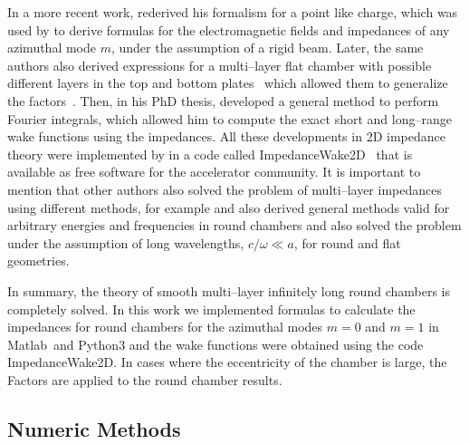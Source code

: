     In a more recent work,  rederived his formalism for a point like charge, which was used by  to derive formulas for the electromagnetic fields and impedances of any azimuthal mode $m$, under the assumption of a rigid beam. Later, the same authors also derived expressions for a multi--layer flat chamber with possible different layers in the top and bottom plates~\cite{Mounet2010a} which allowed them to generalize the  factors~\cite{Mounet2010}. Then, in his PhD thesis,  developed a general method to perform Fourier integrals, which allowed him to compute the exact short and long--range wake functions using the impedances. All these developments in 2D impedance theory were implemented by  in a code called ImpedanceWake2D~\cite{Mounet2011} that is available as free software for the accelerator community.
    It is important to mention that other authors also solved the problem of multi--layer impedances using different methods, for example  and  also derived general methods valid for arbitrary energies and frequencies in round chambers and  also solved the problem under the assumption of long wavelengths, $c/\omega \ll a$, for round and flat geometries.

    In summary, the theory of smooth multi--layer infinitely long round chambers is completely solved. In this work we implemented  formulas to calculate the impedances for round chambers for the azimuthal modes $m=0$ and $m=1$ in Matlab\textregistered~and Python3 and the wake functions were obtained using the code ImpedanceWake2D. In cases where the eccentricity of the chamber is large, the  Factors are applied to the round chamber results.

\subsection{Numeric Methods}\label{ssec:numeric_methods}

